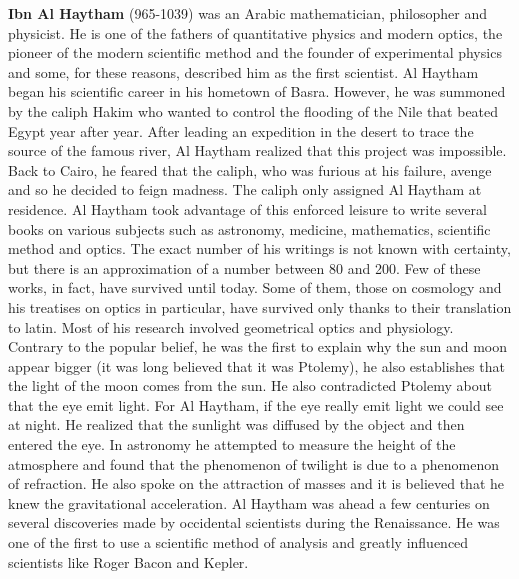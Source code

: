 \textbf{Ibn Al Haytham }(965-1039) was an Arabic mathematician, philosopher and physicist. He is one of the fathers of quantitative physics and modern optics, the pioneer of the modern scientific method and the founder of experimental physics and some, for these reasons, described him as the first scientist. Al Haytham began his scientific career in his hometown of Basra. However, he was summoned by the caliph Hakim who wanted to control the flooding of the Nile that beated Egypt year after year. After leading an expedition in the desert to trace the source of the famous river, Al Haytham realized that this project was impossible. Back to Cairo, he feared that the caliph, who was furious at his failure, avenge and so he decided to feign madness. The caliph only assigned Al Haytham at residence. Al Haytham took advantage of this enforced leisure to write several books on various subjects such as astronomy, medicine, mathematics, scientific method and optics. The exact number of his writings is not known with certainty, but there is an approximation of a number between 80 and 200. Few of these works, in fact, have survived until today. Some of them, those on cosmology and his treatises on optics in particular, have survived only thanks to their translation to latin. Most of his research involved geometrical optics and physiology. Contrary to the popular belief, he was the first to explain why the sun and moon appear bigger (it was long believed that it was Ptolemy), he also establishes that the light of the moon comes from the sun. He also contradicted Ptolemy about that the eye emit light. For Al Haytham, if the eye really emit light we could see at night. He realized that the sunlight was diffused by the object and then entered the eye. In astronomy he attempted to measure the height of the atmosphere and found that the phenomenon of twilight is due to a phenomenon of refraction. He also spoke on the attraction of masses and it is believed that he knew the gravitational acceleration. Al Haytham was ahead a few centuries on several discoveries made by occidental scientists during the Renaissance. He was one of the first to use a scientific method of analysis and greatly influenced scientists like Roger Bacon and Kepler.

{}

